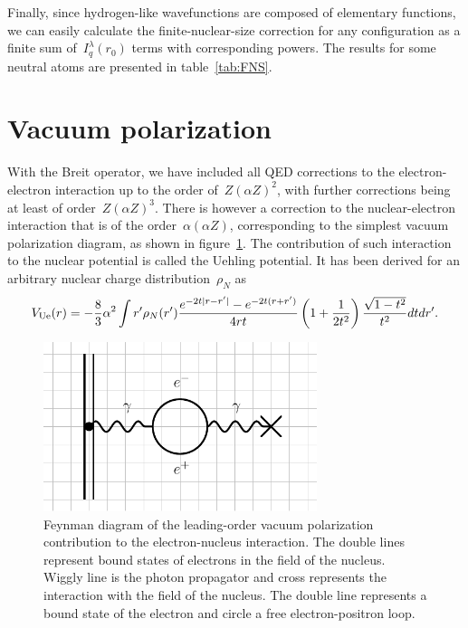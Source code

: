 Finally, since hydrogen-like wavefunctions are composed of elementary functions, we can easily calculate the finite-nuclear-size correction for any configuration as a finite sum of~$I_q^\lambda (r_0)$ terms with corresponding powers. %
 The results for some neutral atoms are presented in table~\ref{tab:FNS}.

\section{Vacuum polarization}

With the Breit operator, we have included all QED corrections to the electron-electron interaction up to the order of~$Z(\alpha Z)^2$, with further corrections being at least of order~$Z(\alpha Z)^3$. There is however a correction to the nuclear-electron interaction that is of the order~$\alpha(\alpha Z)$, %
corresponding to the simplest vacuum polarization diagram, as shown in figure~\ref{UehlingFig}. The contribution of such interaction to the nuclear potential is called the Uehling potential. It has been derived for an arbitrary nuclear charge distribution~$\rho_N$ as~\cite{refId0} 
\begin{equation}
V_{\rm{Ue}}(r) = -\frac{8}{3} \alpha^2\int r'\rho_N(r') \frac{e^{-2t|r-r'|}-e^{-2t(r+r')}}{4rt}\left(1+\frac{1}{2t^2}\right)\frac{\sqrt{1-t^2}}{t^2} dt dr'.
\end{equation}

\begin{figure}  
  \centering
  \includegraphics[width=80mm]{Graphs/UehlingLabeled.pdf} 
  \caption{Feynman diagram of the leading-order vacuum polarization contribution to the electron-nucleus interaction. The double lines represent bound states of electrons in the field of the nucleus. Wiggly line is the photon propagator and cross represents the interaction with the field of the nucleus. The double line represents a bound state of the electron and circle a free electron-positron loop.}
  \label{UehlingFig}
\end{figure} 		

